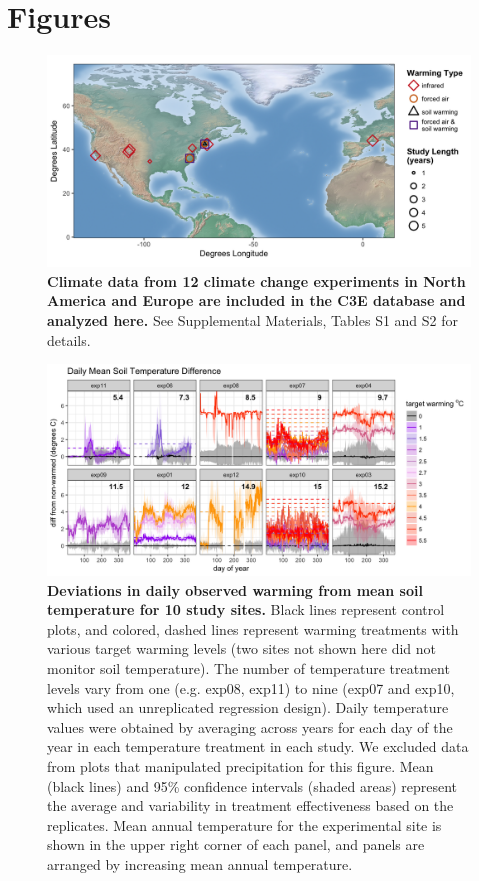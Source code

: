 \documentclass{article}
\begin{document}
\section* {Figures}
\begin{figure}[p]
\centering
\includegraphics{../Analyses/maps/RadcliffeLocations_Experiments_Open.png} 
\caption{\textbf{Climate data from 12 climate change experiments in North America and Europe are included in the C3E database and analyzed here.} See Supplemental Materials, Tables S1 and S2 for details.} 
 \label{fig:map}
 \end{figure}
\clearpage
\begin{figure}[h]
\centering
 \includegraphics{../Analyses/figures/WarmingEffects_TimeSeries_SoilTemp1Mean_Deviation_NoPrecip.png}
 \caption{\textbf{Deviations in daily observed warming from mean soil temperature for 10 study sites.} Black lines represent control plots, and colored, dashed lines represent warming treatments with various target warming levels (two sites not shown here did not monitor soil temperature). The number of temperature treatment levels vary from one (e.g. exp08, exp11) to nine (exp07 and exp10, which used an unreplicated regression design). Daily temperature values were obtained by averaging across years for each day of the year in each temperature treatment in each study. We excluded data from plots that manipulated precipitation for this figure. Mean (black lines) and 95\% confidence intervals (shaded areas) represent the average and variability in treatment effectiveness based on the replicates. Mean annual temperature for the experimental site is shown in the upper right corner of each panel, and panels are arranged by increasing mean annual temperature.}
 \label{fig:effwarm}

 \end{figure}
\end{document}
